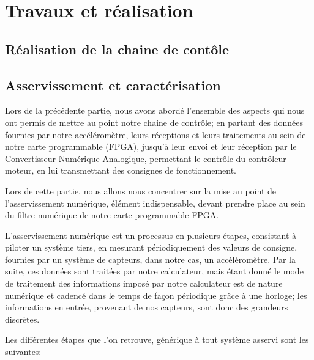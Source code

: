 \documentclass[french,a4paper,12pt]{report}
\begin{document}
	
	\part{Travaux et réalisation}	
	
	\chapter{Réalisation de la chaine de contôle}
	
	
	
	
	\chapter{Asservissement et caractérisation}
	
	Lors de la précédente partie, nous avons abordé l'ensemble des aspects qui nous ont permis de mettre au point notre chaine de contrôle; en partant des données fournies par notre accéléromètre, leurs réceptions et leurs traitements au sein de notre carte programmable (FPGA), jusqu'à leur envoi et leur réception par le Convertisseur Numérique Analogique, permettant le contrôle du contrôleur moteur, en lui transmettant des consignes de fonctionnement.
	
	Lors de cette partie, nous allons nous concentrer sur la mise au point de l'asservissement numérique, élément indispensable, devant prendre place au sein du filtre numérique de notre carte programmable FPGA.
	
	L'asservissement numérique est un processus en plusieurs étapes, consistant à piloter un système tiers, en mesurant périodiquement des valeurs de consigne, fournies par un système de capteurs, dans notre cas, un accéléromètre. 
	Par la suite, ces données sont traitées par notre calculateur, mais étant donné le mode de traitement des informations imposé par notre calculateur est de nature numérique et cadencé dans le temps de façon périodique grâce à une horloge; les informations en entrée, provenant de nos capteurs, sont donc des grandeurs discrètes.
	
	Les différentes étapes que l'on retrouve,  générique à tout système asservi sont les suivantes:
	
\end{document}
